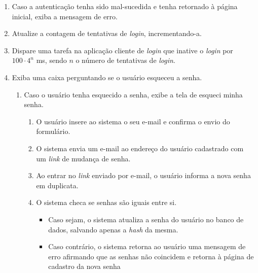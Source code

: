 \documentclass[12pt, a4paper]{article}
\newcommand{\tit}[1]{\textit{#1}}
\newcommand{\quotes}[1]{``#1''}
\begin{document}
\begin{enumerate}[label=\textbf{\arabic*.}]
{\begin{enumerate}[label={\arabic*.}]
\begin{enumerate}[label={\alph*.}]
\begin{enumerate}[label={\roman*.}]
                                 \item Caso os códigos das senhas forem diferentes, retorna à tela de login informando a mensagem \quotes{A senha está incorreta!} escrita em vermelho.
                            \end{enumerate}
                         
                         \item Se o usuário não foi encontrado, retorna à tela de login informando a mensagem \quotes{O usuário informado não existe!} escrita em vermelho.
                     \end{enumerate}
                 \item Caso a autenticação tenha sido mal-sucedida e tenha retornado à página inicial, exiba a mensagem de erro.
                 \item Atualize a contagem de tentativas de \tit{login}, incrementando-a.
                 \item Dispare uma tarefa na aplicação cliente de \tit{login} que inative o \tit{login} por $ 100 \cdot 4^n $ ms, sendo $n$ o número de tentativas de \tit{login}.
                 \item Exiba uma caixa perguntando se o usuário esqueceu a senha.
                 \begin{enumerate}[label={\alph*.}]
                     \item Caso o usuário tenha esquecido a senha, exibe a tela de esqueci minha senha.
                     \begin{enumerate}[label={\roman*.}]
                         \item O usuário insere ao sistema o seu e-mail e confirma o envio do formulário.
                         \item O sistema envia um e-mail ao endereço do usuário cadastrado com um \tit{link} de mudança de senha.
                         \item Ao entrar no \tit{link} enviado por e-mail, o usuário informa a nova senha em duplicata.
                         \item O sistema checa se senhas são iguais entre si.
                         \begin{itemize}
                             \item Caso sejam, o sistema atualiza a senha do usuário no banco de dados, salvando apenas a \tit{hash} da mesma.
                             \item Caso contrário, o sistema retorna ao usuário uma mensagem de erro afirmando que as senhas não coincidem e retorna à página de cadastro da nova senha

\end{itemize}
\end{enumerate}
\end{enumerate}
\end{enumerate}}
\end{enumerate}
\end{document}
